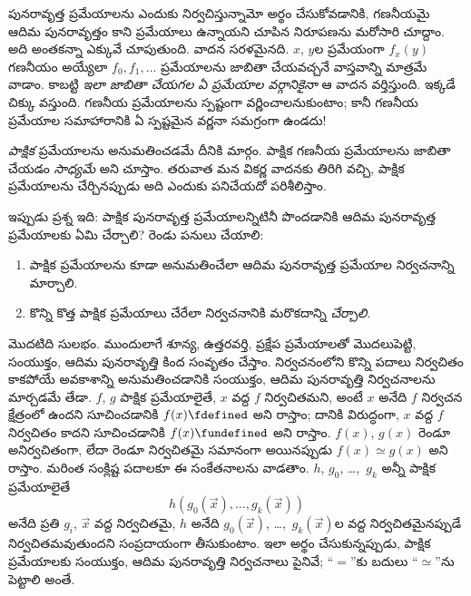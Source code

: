 \documentclass[../../../include/open-logic-section]{subfiles}
\begin{document}


పునరావృత్త ప్రమేయాలను ఎందుకు నిర్వచిస్తున్నామో అర్థం చేసుకోవడానికి,
గణనీయమై ఆదిమ పునరావృత్తం కాని ప్రమేయాలు ఉన్నాయని చూపిన నిరూపణను
మరోసారి చూద్దాం. అది అంతకన్నా ఎక్కువే చూపుతుంది. వాదన సరళమైనది. $x$, $y$ల ప్రమేయంగా $f_x(y)$ గణనీయం
అయ్యేలా $f_0,f_1,\dots$ ప్రమేయాలను జాబితా చేయవచ్చనే వాస్తవాన్ని
మాత్రమే వాడాం. కాబట్టి \emph{ఇలా జాబితా చేయగల ఏ ప్రమేయాల వర్గానికైనా}
ఆ వాదన వర్తిస్తుంది. ఇక్కడే చిక్కు వస్తుంది. గణనీయ ప్రమేయాలను
స్పష్టంగా వర్ణించాలనుకుంటాం; కానీ గణనీయ ప్రమేయాల సమాహారానికి ఏ
స్పష్టమైన వర్ణనా సమగ్రంగా ఉండదు!

\emph{పాక్షిక} ప్రమేయాలను అనుమతించడమే దీనికి మార్గం. పాక్షిక గణనీయ
ప్రమేయాలను జాబితా చేయడం \emph{సాధ్యమే} అని చూస్తాం. తరువాత మన వికర్ణ వాదనకు తిరిగి
వచ్చి, పాక్షిక ప్రమేయాలను చేర్చినప్పుడు అది ఎందుకు పనిచేయదో
పరిశీలిస్తాం.

ఇప్పుడు ప్రశ్న ఇది: పాక్షిక పునరావృత్త ప్రమేయాలన్నిటినీ పొందడానికి
ఆదిమ పునరావృత్త ప్రమేయాలకు ఏమి చేర్చాలి? రెండు పనులు చేయాలి:
\begin{enumerate}
\item పాక్షిక ప్రమేయాలను కూడా అనుమతించేలా ఆదిమ పునరావృత్త ప్రమేయాల
  నిర్వచనాన్ని మార్చాలి.
\item కొన్ని కొత్త పాక్షిక ప్రమేయాలు చేరేలా నిర్వచనానికి మరొకదాన్ని
  \emph{చేర్చాలి}.
\end{enumerate}

మొదటిది సులభం. ముందులాగే శూన్య, ఉత్తరవర్తి, ప్రక్షేప ప్రమేయాలతో మొదలుపెట్టి,
సంయుక్తం, ఆదిమ పునరావృత్తి కింద సంవృతం చేస్తాం. నిర్వచనంలోని కొన్ని
పదాలు నిర్వచితం కాకపోయే అవకాశాన్ని అనుమతించడానికి సంయుక్తం, ఆదిమ
పునరావృత్తి నిర్వచనాలను మార్చడమే తేడా. $f$, $g$ పాక్షిక ప్రమేయాలైతే,
$x$ వద్ద $f$ నిర్వచితమని, అంటే $x$ అనేది $f$ నిర్వచన క్షేత్రంలో ఉందని
సూచించడానికి $f(x)\fdefined$ అని రాస్తాం; దానికి విరుద్ధంగా, $x$
వద్ద $f$ నిర్వచితం కాదని సూచించడానికి $f(x)\fundefined$ అని రాస్తాం.
$f(x)$, $g(x)$ రెండూ అనిర్వచితంగా, లేదా రెండూ నిర్వచితమై సమానంగా
అయినప్పుడు $f(x)\simeq g(x)$ అని రాస్తాం. మరింత సంక్లిష్ట పదాలకూ ఈ
సంకేతనాలను వాడతాం. $h$, $g_0$, \dots,~$g_k$ అన్నీ పాక్షిక
ప్రమేయాలైతే
\[
h(g_0(\vec x),\dots,g_k(\vec x))
\]
అనేది ప్రతి $g_i$, $\vec x$ వద్ద నిర్వచితమై, $h$ అనేది
$g_0(\vec x)$, \dots,~$g_k(\vec x)$ల వద్ద నిర్వచితమైనప్పుడే
నిర్వచితమవుతుందని సంప్రదాయంగా తీసుకుంటాం. ఇలా అర్థం చేసుకున్నప్పుడు,
పాక్షిక ప్రమేయాలకు సంయుక్తం, ఆదిమ పునరావృత్తి నిర్వచనాలు పైనివే;
``$=$''కు బదులు ``$\simeq$''ను పెట్టాలి అంతే.
\end{document}

